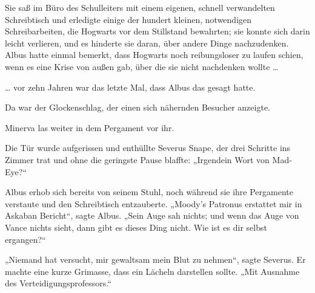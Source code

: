 Sie saß im Büro des Schulleiters mit einem eigenen, schnell verwandelten Schreibtisch und erledigte einige der hundert kleinen, notwendigen Schreibarbeiten, die Hogwarts vor dem Stillstand bewahrten; sie konnte sich darin leicht verlieren, und es hinderte sie daran, über andere Dinge nachzudenken. Albus hatte einmal bemerkt, dass Hogwarts noch reibungsloser zu laufen schien, wenn es eine Krise von außen gab, über die sie nicht nachdenken wollte …

… vor zehn Jahren war das letzte Mal, dass Albus das gesagt hatte.

Da war der Glockenschlag, der einen sich nähernden Besucher anzeigte.

Minerva las weiter in dem Pergament vor ihr.

Die Tür wurde aufgerissen und enthüllte Severus Snape, der drei Schritte ins Zimmer trat und ohne die geringste Pause blaffte:
„Irgendein Wort von Mad-Eye?“

Albus erhob sich bereits von seinem Stuhl, noch während sie ihre Pergamente verstaute und den Schreibtisch entzauberte.
„Moody’s Patronus erstattet mir in Askaban Bericht“, sagte Albus.
„Sein Auge sah nichts; und wenn das Auge von Vance nichts sieht, dann gibt es dieses Ding nicht. Wie ist es dir selbst ergangen?“

„Niemand hat versucht, mir gewaltsam mein Blut zu nehmen“, sagte Severus. Er machte eine kurze Grimasse, dass ein Lächeln darstellen sollte.
„Mit Ausnahme des Verteidigungsprofessors.“

